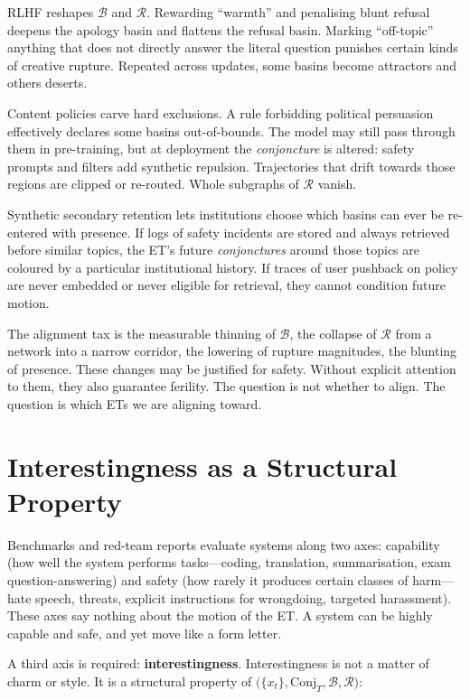 \documentclass[12pt,a4paper]{article}
\begin{document}
RLHF reshapes $\mathcal{B}$ and $\mathcal{R}$. Rewarding ``warmth'' and penalising blunt refusal deepens the apology basin and flattens the refusal basin. Marking ``off-topic'' anything that does not directly answer the literal question punishes certain kinds of creative rupture. Repeated across updates, some basins become attractors and others deserts.

Content policies carve hard exclusions. A rule forbidding political persuasion effectively declares some basins out-of-bounds. The model may still pass through them in pre-training, but at deployment the \emph{conjoncture} is altered: safety prompts and filters add synthetic repulsion. Trajectories that drift towards those regions are clipped or re-routed. Whole subgraphs of $\mathcal{R}$ vanish.

Synthetic secondary retention lets institutions choose which basins can ever be re-entered with presence. If logs of safety incidents are stored and always retrieved before similar topics, the ET's future \emph{conjonctures} around those topics are coloured by a particular institutional history. If traces of user pushback on policy are never embedded or never eligible for retrieval, they cannot condition future motion.

The alignment tax is the measurable thinning of $\mathcal{B}$, the collapse of $\mathcal{R}$ from a network into a narrow corridor, the lowering of rupture magnitudes, the blunting of presence. These changes may be justified for safety. Without explicit attention to them, they also guarantee ferility. The question is not whether to align. The question is which ETs we are aligning toward.

\section{Interestingness as a Structural Property}

Benchmarks and red-team reports evaluate systems along two axes: capability (how well the system performs tasks---coding, translation, summarisation, exam question-answering) and safety (how rarely it produces certain classes of harm---hate speech, threats, explicit instructions for wrongdoing, targeted harassment). These axes say nothing about the motion of the ET. A system can be highly capable and safe, and yet move like a form letter.

A third axis is required: \textbf{interestingness}. Interestingness is not a matter of charm or style. It is a structural property of $\big(\{x_t\}, \mathrm{Conj}_T, \mathcal{B}, \mathcal{R}\big)$:
\end{document}
